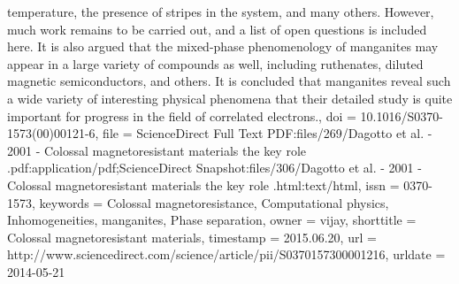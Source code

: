 {{	temperature, the presence of stripes in the system, and many others.
	However, much work remains to be carried out, and a list of open
	questions is included here. It is also argued that the mixed-phase
	phenomenology of manganites may appear in a large variety of compounds
	as well, including ruthenates, diluted magnetic semiconductors, and
	others. It is concluded that manganites reveal such a wide variety
	of interesting physical phenomena that their detailed study is quite
	important for progress in the field of correlated electrons.},
  doi = {10.1016/S0370-1573(00)00121-6},
  file = {ScienceDirect Full Text PDF:files/269/Dagotto et al. - 2001 - Colossal magnetoresistant materials the key role .pdf:application/pdf;ScienceDirect Snapshot:files/306/Dagotto et al. - 2001 - Colossal magnetoresistant materials the key role .html:text/html},
  issn = {0370-1573},
  keywords = {Colossal magnetoresistance, Computational physics, Inhomogeneities,
	manganites, Phase separation},
  owner = {vijay},
  shorttitle = {Colossal magnetoresistant materials},
  timestamp = {2015.06.20},
  url = {http://www.sciencedirect.com/science/article/pii/S0370157300001216},
  urldate = {2014-05-21}
}

